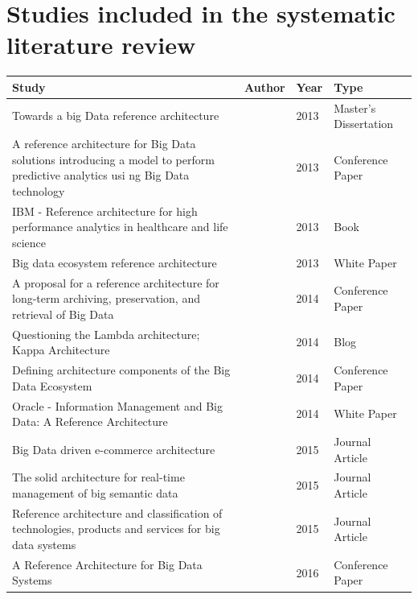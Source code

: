 \documentclass[review]{elsarticle}
\begin{document}
\section{Studies included in the systematic literature review} \label{appendixA:SLR}
\begin{longtable}{|p{5cm} | p{1cm}  | p{1cm} | p{3.4cm}|}
    \hline
    Study  & Author & Year & Type \\ [0.5ex]
    \hline
    Towards a big Data reference architecture  & \cite{Maier}& 2013 & Master's Dissertation \\
    \hline
    A reference architecture for Big Data solutions introducing a model to perform predictive analytics usi ng Big Data technology  & \cite{geerdink2013reference}  & 2013 & Conference Paper \\
    \hline
    IBM - Reference architecture for high performance analytics in healthcare and life science  & \cite{quintero2019ibm} & 2013 & Book \\ [1ex]
    \hline
    Big data ecosystem reference architecture  &
    \cite{levin2013big} & 2013 & White Paper \\ [1ex]
    \hline
    A proposal for a reference architecture for long-term archiving, preservation, and retrieval of Big Data  & \cite{viana2014proposal}  & 2014 & Conference Paper \\
    \hline
    Questioning the Lambda architecture; Kappa Architecture  & \cite{kreps2014questioning}  & 2014 & Blog \\
    \hline
    Defining architecture components of the Big Data Ecosystem  & \cite{demchenko2014defining} & 2014 & Conference Paper   \\ [1ex]
    \hline
    Oracle - Information Management and Big Data: A Reference Architecture   &
    \cite{cackett2013information} & 2014 & White Paper \\ [1ex]
    \hline
    Big Data driven e-commerce architecture   & \cite{ghandour2015big} & 2015 & Journal Article \\ [1ex]
    \hline
    The solid architecture for real-time management of big semantic data & \cite{martinez2015solid} & 2015 &  Journal Article \\ [1ex]
    \hline
    Reference architecture and classification of technologies, products and services for big data systems  & \cite{paakkonen2015reference}  & 2015 & Journal Article \\ [1ex]
    \hline
    A Reference Architecture for Big Data Systems  & \cite{sang2016reference}  & 2016 & Conference Paper  \\

\end{longtable}
\end{document}
